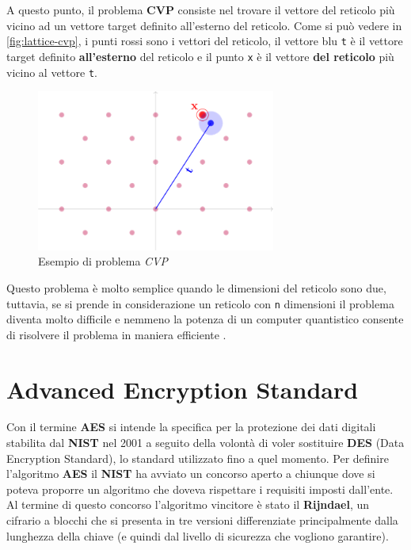 A questo punto, il problema \textbf{CVP} consiste nel trovare il vettore del reticolo più vicino ad un vettore target definito all'esterno del reticolo. Come si può vedere in \autoref{fig:lattice-cvp}, i punti rossi sono i vettori del reticolo, il vettore blu \texttt{t} è il vettore target definito \textbf{all'esterno} del reticolo e il punto \texttt{x} è il vettore \textbf{del reticolo} più vicino al vettore \texttt{t}. \cite{telsy_lattice}

\begin{figure}[h]
    \centering
    \includegraphics[width=0.7\textwidth]{capitoli/figure-crittografia/lattice-cvp.png}
    \caption{Esempio di problema \emph{CVP}}
    \label{fig:lattice-cvp}
\end{figure}

Questo problema è molto semplice quando le dimensioni del reticolo sono due, tuttavia, se si prende in considerazione un reticolo con \texttt{n} dimensioni il problema diventa molto difficile e nemmeno la potenza di un computer quantistico consente di risolvere il problema in maniera efficiente \cite{hwupgrade_kyber}.

\section{Advanced Encryption Standard}
Con il termine \textbf{AES} si intende la specifica per la protezione dei dati digitali stabilita dal \textbf{NIST} nel 2001 a seguito della volontà di voler sostituire \textbf{DES} (Data Encryption Standard), lo standard utilizzato fino a quel momento. Per definire l'algoritmo \textbf{AES} il \textbf{NIST} ha avviato un concorso aperto a chiunque dove si poteva proporre un algoritmo che doveva rispettare i requisiti imposti dall'ente. Al termine di questo concorso l'algoritmo vincitore è stato il \textbf{Rijndael}, un cifrario a blocchi che si presenta in tre versioni differenziate principalmente dalla lunghezza della chiave (e quindi dal livello di sicurezza che vogliono garantire).

